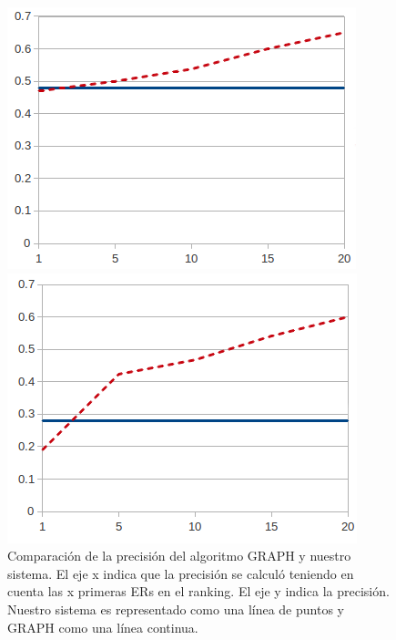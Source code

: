 \begin{figure}[h]
\begin{minipage}{0.49\linewidth}
\centering
\includegraphics[width=\textwidth]{images/furniturePrec.png}
\caption{}

\end{minipage}

\begin{minipage}{0.49\linewidth}
\centering
\includegraphics[width=\textwidth]{images/precP.png}
\caption{}
\end{minipage}
\caption{Comparaci\'on de la precisi\'on  del algoritmo GRAPH y nuestro sistema. El eje x indica que la precisi\'on se calcul\'o teniendo en cuenta las x primeras ERs en el ranking. El eje y indica la precisi\'on. Nuestro sistema es representado como una l\'inea de puntos y GRAPH como una l\'inea continua.\label{graficoPresicion}}
\end{figure}

